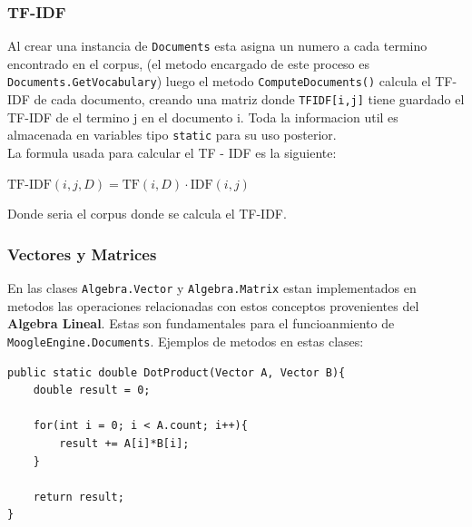 \documentclass[11pt]{beamer}
\begin{document}
\begin{frame}
    \frametitle{TF-IDF}
    \begin{flushleft}
        
        Al crear una instancia de \texttt{Documents} esta asigna un numero a cada termino encontrado en el corpus, (el metodo encargado de este proceso es \texttt{Documents.GetVocabulary}) luego el metodo \texttt{ComputeDocuments()} calcula el TF-IDF de cada documento, creando una matriz donde \texttt{TFIDF[i,j]} tiene guardado el TF-IDF de el termino j en el documento i. Toda la informacion util es almacenada en variables tipo \texttt{static} para su uso posterior.\\
        \vspace{5pt}
        La formula usada para calcular el TF - IDF es la siguiente:
        
        \begin{center}
            
            $    
            \mathrm{TF\text{-}IDF}(i,j,D) = \mathrm{TF}(i,D) \cdot \mathrm{IDF}(i,j)
            $
        
        \end{center}

    Donde \emph{  } seria el corpus donde se calcula el TF-IDF.
\end{flushleft}

\end{frame}

\begin{frame}[fragile]
    \frametitle{Vectores y Matrices}
    En las clases \texttt{Algebra.Vector} y \texttt{Algebra.Matrix} estan implementados en metodos las operaciones relacionadas con estos conceptos provenientes del \textbf{Algebra Lineal}. Estas son fundamentales para el funcioanmiento de \texttt{MoogleEngine.Documents}.
    \vspace{5pt}
    Ejemplos de metodos en estas clases:
    \begin{Verbatim}[frame=single]
public static double DotProduct(Vector A, Vector B){     
    double result = 0;

    for(int i = 0; i < A.count; i++){
        result += A[i]*B[i];
    }
        
    return result;
}
    \end{Verbatim}
   
\end{frame}
\end{document}
